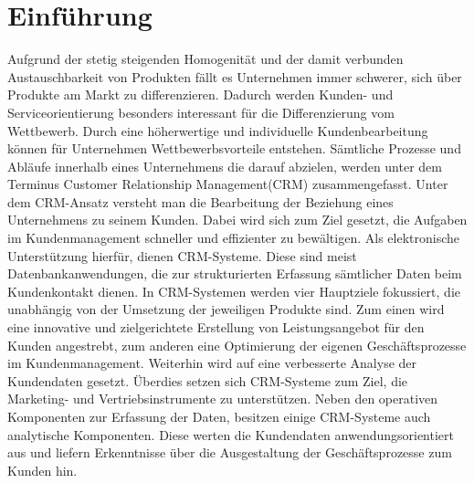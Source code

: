 \chapter{Einführung}
\label{ch:Einfuehrung}

Aufgrund der stetig steigenden Homogenität und der damit verbunden Austauschbarkeit von Produkten fällt es Unternehmen immer schwerer, sich über Produkte am Markt zu differenzieren. Dadurch werden Kunden- und Serviceorientierung besonders interessant für die Differenzierung vom Wettbewerb. Durch eine höherwertige und individuelle Kundenbearbeitung können für Unternehmen Wettbewerbsvorteile entstehen. Sämtliche Prozesse und Abläufe innerhalb eines Unternehmens die darauf abzielen, werden unter dem Terminus Customer Relationship Management(CRM) zusammengefasst. Unter dem CRM-Ansatz versteht man die Bearbeitung der Beziehung eines Unternehmens zu seinem Kunden. Dabei wird sich zum Ziel gesetzt, die Aufgaben im Kundenmanagement schneller und effizienter zu bewältigen. Als elektronische Unterstützung hierfür, dienen CRM-Systeme. Diese sind meist Datenbankanwendungen, die zur strukturierten Erfassung sämtlicher Daten beim Kundenkontakt dienen. In CRM-Systemen werden vier Hauptziele fokussiert, die unabhängig von der Umsetzung der jeweiligen Produkte sind. Zum einen wird eine innovative und zielgerichtete Erstellung von Leistungsangebot für den Kunden angestrebt, zum anderen eine Optimierung der eigenen Geschäftsprozesse im Kundenmanagement. Weiterhin wird auf eine verbesserte Analyse der Kundendaten gesetzt. Überdies setzen sich CRM-Systeme zum Ziel, die Marketing- und Vertriebsinstrumente zu unterstützen. Neben den operativen Komponenten zur Erfassung der Daten, besitzen einige CRM-Systeme auch analytische Komponenten. Diese werten die Kundendaten anwendungsorientiert aus und liefern Erkenntnisse über die Ausgestaltung der Geschäftsprozesse zum Kunden hin.

